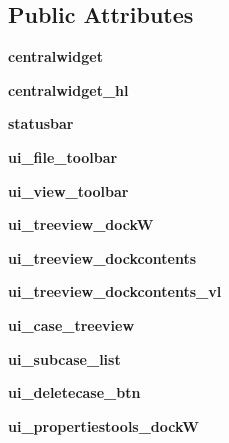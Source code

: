 \subsection*{Public Attributes}
\begin{DoxyCompactItemize}
\item 
\hypertarget{a00099_a2a323cc6e8e271345a42cb3342820d3b}{}\label{a00099_a2a323cc6e8e271345a42cb3342820d3b} 
{\bfseries centralwidget}
\item 
\hypertarget{a00099_a84fbe4915db0698d6779bab59a55b20a}{}\label{a00099_a84fbe4915db0698d6779bab59a55b20a} 
{\bfseries centralwidget\+\_\+hl}
\item 
\hypertarget{a00099_a840ced767970f65402ef894fb5fcc3f3}{}\label{a00099_a840ced767970f65402ef894fb5fcc3f3} 
{\bfseries statusbar}
\item 
\hypertarget{a00099_aa1bd7f326134cd7873cadb8a3e89d866}{}\label{a00099_aa1bd7f326134cd7873cadb8a3e89d866} 
{\bfseries ui\+\_\+file\+\_\+toolbar}
\item 
\hypertarget{a00099_ada862a642c3a9c359564a67539047d12}{}\label{a00099_ada862a642c3a9c359564a67539047d12} 
{\bfseries ui\+\_\+view\+\_\+toolbar}
\item 
\hypertarget{a00099_aaa6b736b767520bf24e89cfaf72ae15f}{}\label{a00099_aaa6b736b767520bf24e89cfaf72ae15f} 
{\bfseries ui\+\_\+treeview\+\_\+dockW}
\item 
\hypertarget{a00099_ae11b22f4f511169e79dd98b5e886890d}{}\label{a00099_ae11b22f4f511169e79dd98b5e886890d} 
{\bfseries ui\+\_\+treeview\+\_\+dockcontents}
\item 
\hypertarget{a00099_a6bf94b92513eaa3732c9dfec3f32697c}{}\label{a00099_a6bf94b92513eaa3732c9dfec3f32697c} 
{\bfseries ui\+\_\+treeview\+\_\+dockcontents\+\_\+vl}
\item 
\hypertarget{a00099_a43692c1dd9ca5ac7d3b92aefb56d3a47}{}\label{a00099_a43692c1dd9ca5ac7d3b92aefb56d3a47} 
{\bfseries ui\+\_\+case\+\_\+treeview}
\item 
\hypertarget{a00099_ab7e73e16ab3e6b27d3d50400bc8adaa9}{}\label{a00099_ab7e73e16ab3e6b27d3d50400bc8adaa9} 
{\bfseries ui\+\_\+subcase\+\_\+list}
\item 
\hypertarget{a00099_ab81dbfc042d78295a9c868c026846575}{}\label{a00099_ab81dbfc042d78295a9c868c026846575} 
{\bfseries ui\+\_\+deletecase\+\_\+btn}
\item 
\hypertarget{a00099_a8507133b9e49326677916d0b69587180}{}\label{a00099_a8507133b9e49326677916d0b69587180} 
{\bfseries ui\+\_\+propertiestools\+\_\+dockW}
\item 

\end{DoxyCompactItemize}

